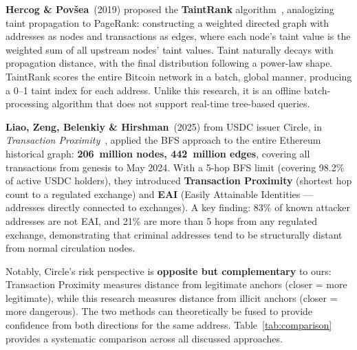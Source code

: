 \documentclass[12pt,a4paper]{article}
\begin{document}
\textbf{Hercog \& Pov\v{s}ea}~(2019) proposed the \textbf{TaintRank} algorithm~\cite{hercog2019}, analogizing taint propagation to PageRank: constructing a weighted directed graph with addresses as nodes and transactions as edges, where each node's taint value is the weighted sum of all upstream nodes' taint values. Taint naturally decays with propagation distance, with the final distribution following a power-law shape. TaintRank scores the entire Bitcoin network in a batch, global manner, producing a 0--1 taint index for each address. Unlike this research, it is an offline batch-processing algorithm that does not support real-time tree-based queries.

\textbf{Liao, Zeng, Belenkiy \& Hirshman}~(2025) from USDC issuer Circle, in \textit{Transaction Proximity}~\cite{liao2025}, applied the BFS approach to the entire Ethereum historical graph: \textbf{206~million nodes, 442~million edges}, covering all transactions from genesis to May 2024. With a 5-hop BFS limit (covering 98.2\% of active USDC holders), they introduced \textbf{Transaction Proximity} (shortest hop count to a regulated exchange) and \textbf{EAI} (Easily Attainable Identities --- addresses directly connected to exchanges). A key finding: 83\% of known attacker addresses are not EAI, and 21\% are more than 5 hops from any regulated exchange, demonstrating that criminal addresses tend to be structurally distant from normal circulation nodes.

Notably, Circle's risk perspective is \textbf{opposite but complementary} to ours: Transaction Proximity measures distance from legitimate anchors (closer = more legitimate), while this research measures distance from illicit anchors (closer = more dangerous). The two methods can theoretically be fused to provide confidence from both directions for the same address. Table~\ref{tab:comparison} provides a systematic comparison across all discussed approaches.
\end{document}
